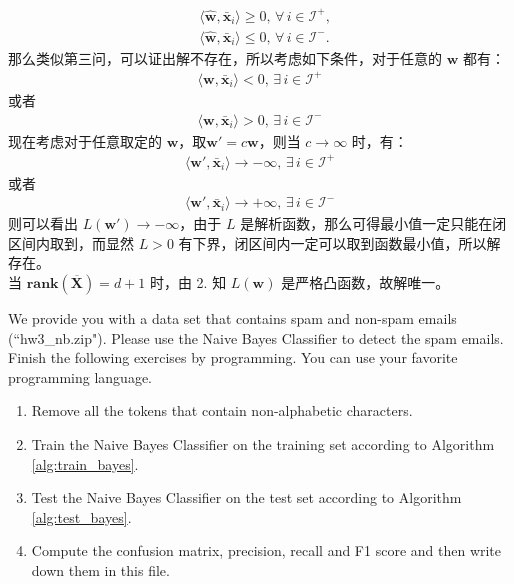\documentclass[11pt,letter,notitlepage]{article}
\newcommand{\rank}[1]{ \textbf{rank}  (#1)  }
\begin{document}
\begin{solution}
\begin{enumerate}
\begin{align*}
		&\langle \hat{\mathbf{w}}, \mathbf{\bar{x}}_i\rangle \geq 0,\,\forall\,i\in\mathcal{I}^+,\\
	    &\langle \hat{\mathbf{w}}, \mathbf{\bar{x}}_i\rangle \leq 0,\,\forall\,i\in\mathcal{I}^-.
	\end{align*}
	那么类似第三问，可以证出解不存在，所以考虑如下条件，对于任意的 $\mathbf{w}$ 都有：
	\begin{align*}
		\langle \mathbf{w}, \mathbf{\bar{x}}_i\rangle < 0,\,\exists\,i\in\mathcal{I}^+
	\end{align*}
	或者
	\begin{align*}
	    \langle \mathbf{w}, \mathbf{\bar{x}}_i\rangle > 0,\,\exists\,i\in\mathcal{I}^-
	\end{align*}
	现在考虑对于任意取定的 $\mathbf{w}$，取$\mathbf{w'} = c\mathbf{w}$，则当 $c \rightarrow \infty$ 时，有：
	\begin{align*}
		\langle \mathbf{w'}, \mathbf{\bar{x}}_i\rangle \rightarrow -\infty,\,\exists\,i\in\mathcal{I}^+
	\end{align*}
	或者
	\begin{align*}
		\langle \mathbf{w'}, \mathbf{\bar{x}}_i\rangle \rightarrow +\infty,\,\exists\,i\in\mathcal{I}^-
	\end{align*}
	则可以看出 $L(\mathbf{w'}) \rightarrow -\infty$，由于 $L$ 是解析函数，那么可得最小值一定只能在闭区间内取到，而显然 $ L > 0$ 有下界，闭区间内一定可以取到函数最小值，所以解存在。\\
	当 $\rank{\overline{\mathbf{X}}}=d+1$ 时，由 2. 知 $L(\mathbf{w})$ 是严格凸函数，故解唯一。
	\end{enumerate}
\end{solution}


\newpage
\begin{exercise}
We provide you with a data set that contains spam and non-spam emails (``hw3\_nb.zip"). Please use the Naive Bayes Classifier to detect the spam emails.
Finish the following exercises by programming. You can use your favorite programming language.
\begin{enumerate}
\item Remove all the tokens that contain non-alphabetic characters.
\item Train the Naive Bayes Classifier on the training set according to Algorithm \ref{alg:train_bayes}.
\item Test the Naive Bayes Classifier on the test set according to Algorithm \ref{alg:test_bayes}.
\item Compute the confusion matrix, precision, recall and F1 score and then write down them in this file.
\end{enumerate}

\end{exercise}
\end{document}
